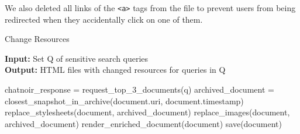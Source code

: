 We also deleted all links of the \texttt{<a>} tags from the file to prevent users from being redirected when they accidentally click on one of them.
\begin{algorithm}[t!]
	\caption{Change Resources}\label{alg:resources}
	\hspace*{\algorithmicindent} \textbf{Input:} Set Q of sensitive search queries \\
    \hspace*{\algorithmicindent} \textbf{Output:} HTML files with changed resources for queries in Q
	\begin{algorithmic}[1]
		    \State chatnoir\_response = request\_top\_3\_documents(q)
		        \State archived\_document = closest\_snapshot\_in\_archive(document.uri, 
		        \State \hspace{9.7em} document.timestamp)
                    \State replace\_stylesheets(document, archived\_document)
		          \State replace\_images(document, archived\_document) 
		          \State render\_enriched\_document(document)
		          \State save(document)
		        \EndIf
		  \EndFor
	    \EndFor
	\end{algorithmic} 
\end{algorithm}

\newpage
